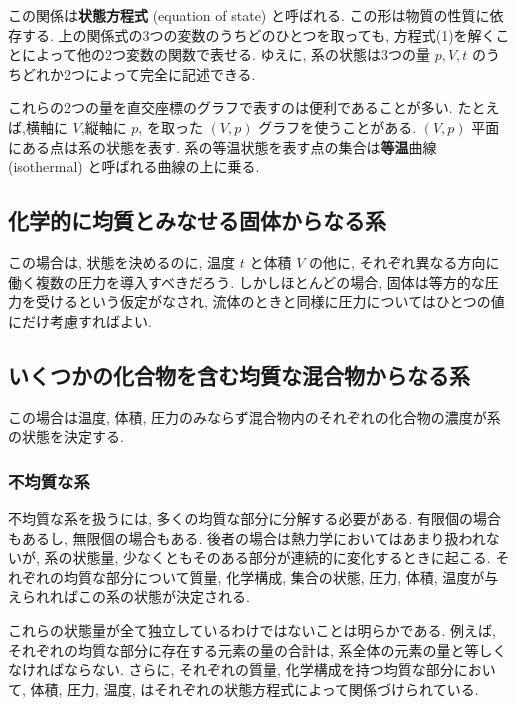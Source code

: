 この関係は\textbf{状態方程式} (equation of state) と呼ばれる. この形は物質の性質に依存する. 上の関係式の3つの変数のうちどのひとつを取っても, 方程式(1)を解くことによって他の2つ変数の関数で表せる. ゆえに, 系の状態は3つの量 $p,V,t$ のうちどれか2つによって完全に記述できる.\par
これらの2つの量を直交座標のグラフで表すのは便利であることが多い. たとえば,横軸に $V$,縦軸に $p$, を取った $(V,p)$ グラフを使うことがある. $(V,p)$ 平面にある点は系の状態を表す. 系の等温状態を表す点の集合は\textbf{等温}曲線 (isothermal) と呼ばれる曲線の上に乗る.

\subsection*{化学的に均質とみなせる固体からなる系}
この場合は, 状態を決めるのに, 温度 $t$ と体積 $V$ の他に, それぞれ異なる方向に働く複数の圧力を導入すべきだろう. しかしほとんどの場合, 固体は等方的な圧力を受けるという仮定がなされ, 流体のときと同様に圧力についてはひとつの値にだけ考慮すればよい.

\subsection*{いくつかの化合物を含む均質な混合物からなる系}
この場合は温度, 体積, 圧力のみならず混合物内のそれぞれの化合物の濃度が系の状態を決定する.

\subsubsection*{不均質な系}
不均質な系を扱うには, 多くの均質な部分に分解する必要がある. 有限個の場合もあるし, 無限個の場合もある. 後者の場合は熱力学においてはあまり扱われないが, 系の状態量, 少なくともそのある部分が連続的に変化するときに起こる. それぞれの均質な部分について質量, 化学構成, 集合の状態, 圧力, 体積, 温度が与えられればこの系の状態が決定される. \par
これらの状態量が全て独立しているわけではないことは明らかである. 例えば, それぞれの均質な部分に存在する元素の量の合計は, 系全体の元素の量と等しくなければならない. さらに, それぞれの質量, 化学構成を持つ均質な部分において, 体積, 圧力, 温度, はそれぞれの状態方程式によって関係づけられている. 

